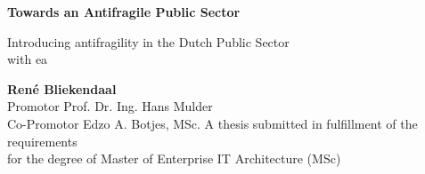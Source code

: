 \begin{titlepage}
	\begin{center}
		\vspace*{1cm}
		\Huge
		\textbf{Towards an Antifragile Public Sector}
		
		\vspace{0.9cm}
		\large
		
		Introducing \Gls{antifragility} in the Dutch Public Sector\\%
		with \gls{ea}
		
		\vspace{1.5cm}
		\Large
		\textbf{René Bliekendaal}\\
		\vspace{0.8cm}
		Promotor Prof. Dr. Ing. Hans Mulder\\
		Co-Promotor Edzo A. Botjes, MSc.		
		\vfill
		\large
		A thesis submitted in fulfillment of the requirements\\
		for the degree of Master of Enterprise IT Architecture (MSc)
		

\end{center}
\end{titlepage}
